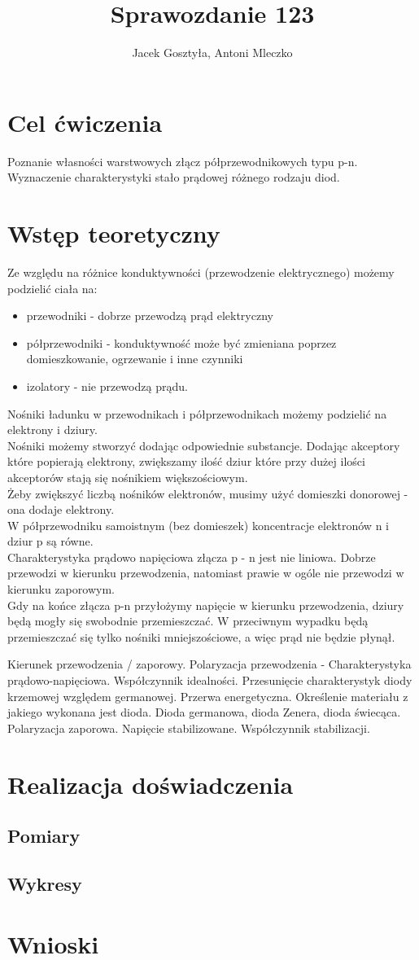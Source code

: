 \documentclass[11pt]{article}
\begin{document}
\title{Sprawozdanie 123}
\author{Jacek Gosztyła, Antoni Mleczko}
\maketitle
\section{Cel ćwiczenia} 
Poznanie własności warstwowych złącz półprzewodnikowych typu p-n. Wyznaczenie charakterystyki stało prądowej różnego rodzaju diod. 
\section{Wstęp teoretyczny}
Ze względu na różnice konduktywności (przewodzenie elektrycznego) możemy podzielić ciała na: 
\begin{itemize}
\item przewodniki - dobrze przewodzą prąd elektryczny
\item półprzewodniki - konduktywność może być zmieniana poprzez domieszkowanie, ogrzewanie i inne czynniki
\item izolatory - nie przewodzą prądu. 
\end{itemize}

Nośniki ładunku w przewodnikach i półprzewodnikach możemy podzielić na elektrony i dziury. \\
Nośniki możemy stworzyć dodając odpowiednie substancje. Dodając akceptory które popierają elektrony, zwiększamy ilość dziur które przy dużej ilości akceptorów stają się nośnikiem większościowym. \\
Żeby zwiększyć liczbą nośników elektronów, musimy użyć  domieszki donorowej - ona dodaje elektrony. \\
W półprzewodniku samoistnym (bez domieszek) koncentracje elektronów n i dziur p są równe. \\
Charakterystyka prądowo napięciowa złącza p - n jest nie liniowa. Dobrze przewodzi w kierunku przewodzenia, natomiast prawie w ogóle nie przewodzi w  kierunku zaporowym.  \\ 
Gdy na końce złącza p-n przyłożymy napięcie w kierunku przewodzenia, dziury będą mogły się swobodnie przemieszczać. W przeciwnym wypadku będą przemieszczać się tylko nośniki mniejszościowe, a więc prąd nie będzie płynął. 



Kierunek przewodzenia / zaporowy.
Polaryzacja przewodzenia - 
Charakterystyka prądowo-napięciowa. 
Współczynnik idealności.
Przesunięcie charakterystyk diody krzemowej względem germanowej. 
Przerwa energetyczna. 
Określenie materiału z jakiego wykonana jest dioda. 
Dioda germanowa, dioda Zenera, dioda świecąca. 
Polaryzacja zaporowa. 
Napięcie stabilizowane.
Współczynnik stabilizacji. 

\section{Realizacja doświadczenia}
\subsection{Pomiary}
\subsection{Wykresy}
\section{Wnioski}
\end{document}
